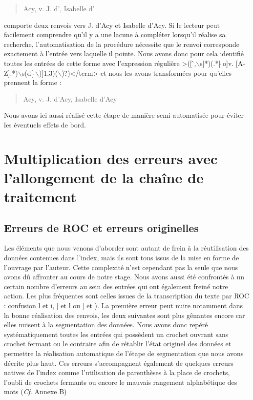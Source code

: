 \documentclass[a4paper,12pt,twoside]{book}
\begin{document}
	\begin{quotation}
		Acy, v. J. d', Isabelle d'
	\end{quotation}

	\noindent comporte deux renvois vers \og J. d'Acy\fg{} et \og Isabelle d'Acy\fg{}. Si le lecteur peut facilement comprendre qu'il y a une lacune à compléter lorsqu'il réalise sa recherche, l'automatisation de la procédure nécessite que le renvoi corresponde exactement à l'entrée vers laquelle il pointe. Nous avons donc pour cela identifié toutes les entrées de cette forme avec l'expression régulière \og >([\,\^\,,$\backslash$s]*)(.*[\,$\hat{}$\,o]v. [A-Z].*)$\backslash$s(d[\,$\hat{}$\,$\backslash$)]{1,3})($\backslash$)?)</term>\fg{} et nous les avons transformées pour qu'elles prennent la forme :
	
	\begin{quotation}
		Acy, v. J. d'Acy, Isabelle d'Acy
	\end{quotation}

	\noindent Nous avons ici aussi réalisé cette étape de manière semi-automatisée pour éviter les éventuels effets de bord.
	
	\section{Multiplication des erreurs avec l’allongement de la chaîne de traitement}
	
	\subsection{Erreurs de ROC et erreurs originelles}
	
	Les éléments que nous venons d'aborder sont autant de frein à la réutilisation des données contenues dans l'index, mais ils sont tous issus de la mise en forme de l'ouvrage par l'auteur. Cette complexité n'est cependant pas la seule que nous avons dû affronter au cours de notre stage. Nous avons aussi été confrontés à un certain nombre d'erreurs au sein des entrées qui ont également freiné notre action. Les plus fréquentes sont celles issues de la transcription du texte par ROC : confusion \og l\fg{} et \og i\fg{}, \og ]\fg{} et \og l\fg{} ou \og ]\fg{} et \og )\fg{}. La première erreur peut nuire notamment dans la bonne réalisation des renvois, les deux suivantes sont plus gênantes encore car elles nuisent à la segmentation des données. Nous avons donc repéré systématiquement toutes les entrées qui possèdent un crochet ouvrant sans crochet fermant ou le contraire afin de rétablir l'état originel des données et permettre la réalisation automatique de l'étape de segmentation que nous avons décrite plus haut. Ces erreurs s'accompagnent également de quelques erreurs natives de l'index comme l'utilisation de parenthèses à la place de crochets, l'oubli de crochets fermants ou encore le mauvais rangement alphabétique des mots (\textit{Cf}. Annexe B)
	
\end{document}
